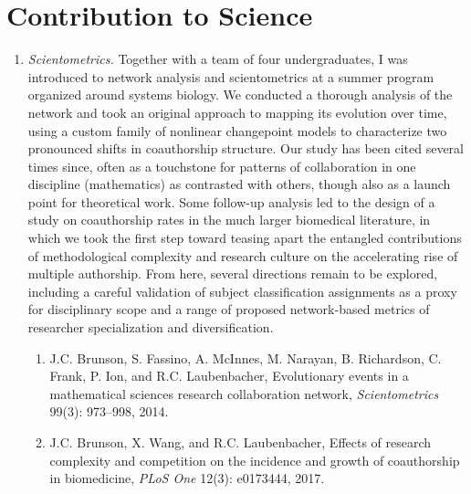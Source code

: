 \documentclass{nihbiosketch}
\begin{document}

\section{Contribution to Science}

\begin{enumerate}

\item \emph{Scientometrics.}
Together with a team of four undergraduates, I was introduced to network analysis and scientometrics at a summer program organized around systems biology. We conducted a thorough analysis of the network and took an original approach to mapping its evolution over time, using a custom family of nonlinear changepoint models to characterize two pronounced shifts in coauthorship structure. Our study has been cited several times since, often as a touchstone for patterns of collaboration in one discipline (mathematics) as contrasted with others, though also as a launch point for theoretical work. Some follow-up analysis led to the design of a study on coauthorship rates in the much larger biomedical literature, in which we took the first step toward teasing apart the entangled contributions of methodological complexity and research culture on the accelerating rise of multiple authorship. From here, several directions remain to be explored, including a careful validation of subject classification assignments as a proxy for disciplinary scope and a range of proposed network-based metrics of researcher specialization and diversification.

\begin{enumerate}
\item J.C. Brunson, S. Fassino, A. McInnes, M. Narayan, B. Richardson, C. Frank, P. Ion, and R.C. Laubenbacher, Evolutionary events in a mathematical sciences research collaboration network, \emph{Scientometrics} 99(3): 973--998, 2014.
\item J.C. Brunson, X. Wang, and R.C. Laubenbacher, Effects of research complexity and competition on the incidence and growth of coauthorship in biomedicine, \emph{PLoS One} 12(3): e0173444, 2017.
\end{enumerate}


\end{enumerate}
\end{document}
